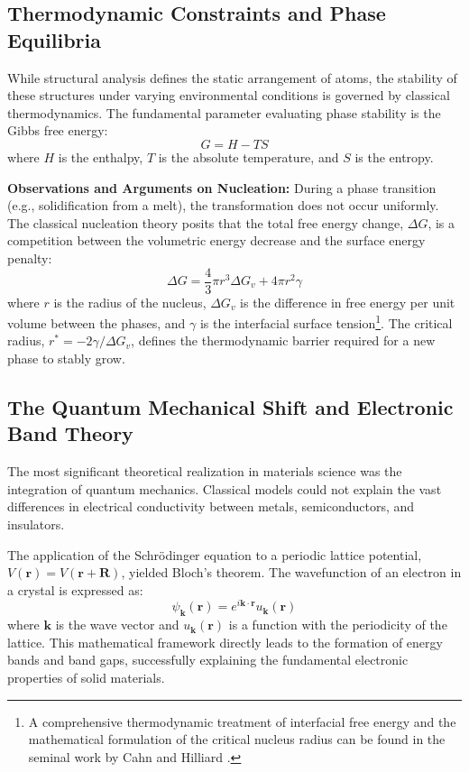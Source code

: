 \documentclass[10pt,a4paper]{article}
\begin{document}
\subsection{Thermodynamic Constraints and Phase Equilibria}

While structural analysis defines the static arrangement of atoms, the stability of these structures under varying environmental conditions is governed by classical thermodynamics. The fundamental parameter evaluating phase stability is the Gibbs free energy:
$$ G = H - TS $$
where $H$ is the enthalpy, $T$ is the absolute temperature, and $S$ is the entropy.

\textbf{Observations and Arguments on Nucleation:} During a phase transition (e.g., solidification from a melt), the transformation does not occur uniformly. The classical nucleation theory posits that the total free energy change, $\Delta G$, is a competition between the volumetric energy decrease and the surface energy penalty:
$$ \Delta G = \frac{4}{3}\pi r^3 \Delta G_v + 4\pi r^2 \gamma $$
where $r$ is the radius of the nucleus, $\Delta G_v$ is the difference in free energy per unit volume between the phases, and $\gamma$ is the interfacial surface tension\footnote{A comprehensive thermodynamic treatment of interfacial free energy and the mathematical formulation of the critical nucleus radius can be found in the seminal work by Cahn and Hilliard \cite{cahn1958}.}. The critical radius, $r^* = -2\gamma / \Delta G_v$, defines the thermodynamic barrier required for a new phase to stably grow.

\subsection{The Quantum Mechanical Shift and Electronic Band Theory}

The most significant theoretical realization in materials science was the integration of quantum mechanics. Classical models could not explain the vast differences in electrical conductivity between metals, semiconductors, and insulators. 

The application of the Schrödinger equation to a periodic lattice potential, $V(\mathbf{r}) = V(\mathbf{r} + \mathbf{R})$, yielded Bloch's theorem. The wavefunction of an electron in a crystal is expressed as:
$$ \psi_{\mathbf{k}}(\mathbf{r}) = e^{i\mathbf{k}\cdot\mathbf{r}} u_{\mathbf{k}}(\mathbf{r}) $$
where $\mathbf{k}$ is the wave vector and $u_{\mathbf{k}}(\mathbf{r})$ is a function with the periodicity of the lattice. This mathematical framework directly leads to the formation of energy bands and band gaps, successfully explaining the fundamental electronic properties of solid materials.
\end{document}
